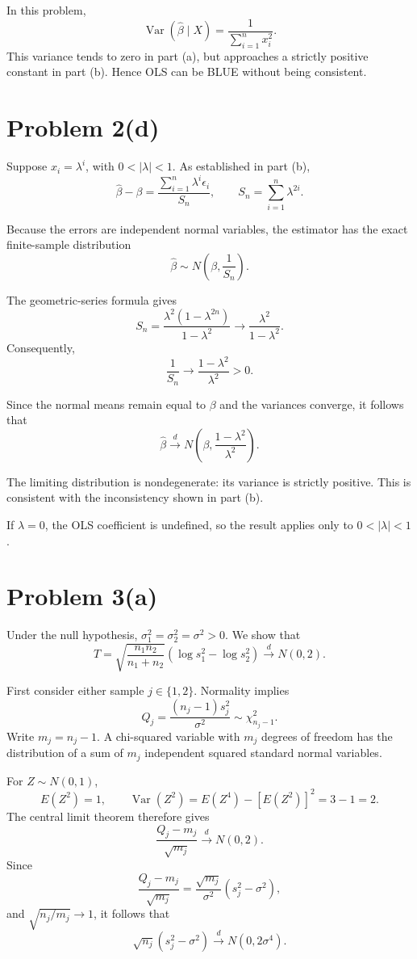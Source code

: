 \documentclass[11pt]{article}
\begin{document}
In this problem,
\[
\operatorname{Var}(\widehat{\beta}\mid X)
=\frac{1}{\sum_{i=1}^n x_i^2}.
\]
This variance tends to zero in part (a), but
approaches a strictly positive constant in
part (b). Hence OLS can be BLUE without
being consistent.
\section*{Problem 2(d)}

Suppose $x_i=\lambda^i$, with $0<|\lambda|<1$.
As established in part (b),
\[
\widehat{\beta}-\beta
=\frac{\sum_{i=1}^n\lambda^i\epsilon_i}{S_n},
\qquad
S_n=\sum_{i=1}^n\lambda^{2i}.
\]

Because the errors are independent normal
variables, the estimator has the exact
finite-sample distribution
\[
\widehat{\beta}
\sim N\left(\beta,\frac{1}{S_n}\right).
\]

The geometric-series formula gives
\[
S_n
=\frac{\lambda^2(1-\lambda^{2n})}{1-\lambda^2}
\longrightarrow
\frac{\lambda^2}{1-\lambda^2}.
\]
Consequently,
\[
\frac{1}{S_n}
\longrightarrow
\frac{1-\lambda^2}{\lambda^2}>0.
\]

Since the normal means remain equal to $\beta$
and the variances converge, it follows that
\[
\boxed{
\widehat{\beta}\xrightarrow{d}
N\left(
\beta,\frac{1-\lambda^2}{\lambda^2}
\right).
}
\]

The limiting distribution is nondegenerate:
its variance is strictly positive. This is
consistent with the inconsistency shown in
part (b).

If $\lambda=0$, the OLS coefficient is undefined,
so the result applies only to $0<|\lambda|<1$.
\clearpage
\section*{Problem 3(a)}

Under the null hypothesis,
$\sigma_1^2=\sigma_2^2=\sigma^2>0$.
We show that
\[
T=
\sqrt{\frac{n_1n_2}{n_1+n_2}}
\left(\log s_1^2-\log s_2^2\right)
\xrightarrow{d}N(0,2).
\]

First consider either sample $j\in\{1,2\}$.
Normality implies
\[
Q_j=\frac{(n_j-1)s_j^2}{\sigma^2}
\sim\chi^2_{n_j-1}.
\]
Write $m_j=n_j-1$. A chi-squared variable with
$m_j$ degrees of freedom has the distribution
of a sum of $m_j$ independent squared standard
normal variables.

For $Z\sim N(0,1)$,
\[
E(Z^2)=1,
\qquad
\operatorname{Var}(Z^2)
=E(Z^4)-[E(Z^2)]^2
=3-1=2.
\]
The central limit theorem therefore gives
\[
\frac{Q_j-m_j}{\sqrt{m_j}}
\xrightarrow{d}N(0,2).
\]
Since
\[
\frac{Q_j-m_j}{\sqrt{m_j}}
=
\frac{\sqrt{m_j}}{\sigma^2}
(s_j^2-\sigma^2),
\]
and $\sqrt{n_j/m_j}\to1$, it follows that
\[
\sqrt{n_j}(s_j^2-\sigma^2)
\xrightarrow{d}N(0,2\sigma^4).
\]
\end{document}
